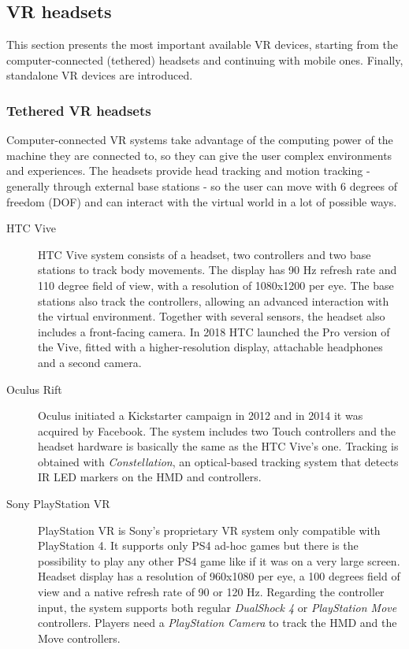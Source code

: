 \documentclass[binding=0.6cm,LaM]{sapthesis}
\begin{document}
\subsection{VR headsets}
\label{sec:vrheadsets}	
This section presents the most important available VR devices, starting from the computer-connected (tethered) headsets and continuing with mobile ones. Finally, standalone VR devices are introduced. 

\subsubsection{Tethered VR headsets}
Computer-connected VR systems take advantage of the computing power of the machine they are connected to, so they can give the user complex environments and experiences. The headsets provide head tracking and motion tracking - generally through external base stations - so the user can move with 6 degrees of freedom (DOF) and can interact with the virtual world in a lot of possible ways. 

\begin{description}

\item[HTC Vive]
HTC Vive system consists of a headset, two controllers and two base stations to track body movements. The display has 90 Hz refresh rate and 110 degree field of view, with a resolution of 1080x1200 per eye. The base stations also track the controllers, allowing an advanced interaction with the virtual environment. Together with several sensors, the headset also includes a front-facing camera. In 2018 HTC launched the Pro version of the Vive, fitted with a higher-resolution display, attachable headphones and a second camera.

\item[Oculus Rift]
Oculus initiated a Kickstarter campaign in 2012 and in 2014 it was acquired by Facebook. The system includes two Touch controllers and the headset hardware is basically the same as the HTC Vive's one. Tracking is obtained with \textit{Constellation}, an optical-based tracking system that detects IR LED markers on the HMD and controllers.

\item[Sony PlayStation VR]
PlayStation VR is Sony's proprietary VR system only compatible with PlayStation 4. It supports only PS4 ad-hoc games but there is the possibility to play any other PS4 game like if it was on a very large screen. Headset display has a resolution of 960x1080 per eye, a 100 degrees field of view and a native refresh rate of 90 or 120 Hz. Regarding the controller input, the system supports both regular \textit{DualShock 4} or \textit{PlayStation Move} controllers. Players need a \textit{PlayStation Camera} to track the HMD and the Move controllers.

\end{description}
\end{document}
